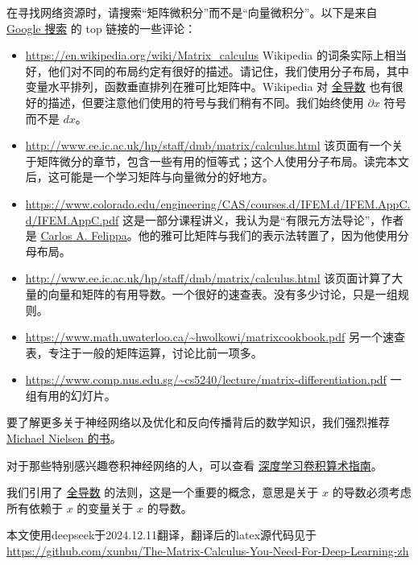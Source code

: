 \documentclass[11pt]{article}
\begin{document}
在寻找网络资源时，请搜索“矩阵微积分”而不是“向量微积分”。以下是来自 \href{https://www.google.com/search?q=matrix+calculus\&oq=matrix+calculus}{Google 搜索} 的 top 链接的一些评论：
\begin{itemize}
\item \href{https://en.wikipedia.org/wiki/Matrix_calculus}{https://en.wikipedia.org/wiki/Matrix_calculus}
Wikipedia 的词条实际上相当好，他们对不同的布局约定有很好的描述。请记住，我们使用分子布局，其中变量水平排列，函数垂直排列在雅可比矩阵中。Wikipedia 对 \href{https://en.wikipedia.org/wiki/Total_derivative}{全导数} 也有很好的描述，但要注意他们使用的符号与我们稍有不同。我们始终使用 $\partial x$ 符号而不是 $dx$。
\item \href{http://www.ee.ic.ac.uk/hp/staff/dmb/matrix/calculus.html}{http://www.ee.ic.ac.uk/hp/staff/dmb/matrix/calculus.html}
该页面有一个关于矩阵微分的章节，包含一些有用的恒等式；这个人使用分子布局。读完本文后，这可能是一个学习矩阵与向量微分的好地方。
\item \href{https://www.colorado.edu/engineering/CAS/courses.d/IFEM.d/IFEM.AppC.d/IFEM.AppC.pdf}{https://www.colorado.edu/engineering/CAS/courses.d/IFEM.d/IFEM.AppC.d/IFEM.AppC.pdf}
这是一部分课程讲义，我认为是“有限元方法导论”，作者是 \href{https://www.colorado.edu/engineering/CAS/courses.d/IFEM.d}{Carlos A. Felippa}。他的雅可比矩阵与我们的表示法转置了，因为他使用分母布局。
\item \href{http://www.ee.ic.ac.uk/hp/staff/dmb/matrix/calculus.html}{http://www.ee.ic.ac.uk/hp/staff/dmb/matrix/calculus.html}
该页面计算了大量的向量和矩阵的有用导数。一个很好的速查表。没有多少讨论，只是一组规则。
\item \href{https://www.math.uwaterloo.ca/~hwolkowi/matrixcookbook.pdf}{https://www.math.uwaterloo.ca/\textasciitilde{}hwolkowi/matrixcookbook.pdf}
另一个速查表，专注于一般的矩阵运算，讨论比前一项多。
\item \href{https://www.comp.nus.edu.sg/~cs5240/lecture/matrix-differentiation.pdf}{https://www.comp.nus.edu.sg/\textasciitilde{}cs5240/lecture/matrix-differentiation.pdf}
一组有用的幻灯片。
\end{itemize}
要了解更多关于神经网络以及优化和反向传播背后的数学知识，我们强烈推荐 \href{http://neuralnetworksanddeeplearning.com/chap1.html}{Michael Nielsen 的书}。

对于那些特别感兴趣卷积神经网络的人，可以查看 \href{https://arxiv.org/pdf/1603.07285.pdf}{深度学习卷积算术指南}。

我们引用了 \href{https://en.wikipedia.org/wiki/Total_derivative}{全导数} 的法则，这是一个重要的概念，意思是关于 $x$ 的导数必须考虑所有依赖于 $x$ 的变量关于 $x$ 的导数。

本文使用deepseek于2024.12.11翻译，翻译后的latex源代码见于\href{https://github.com/xunbu/The-Matrix-Calculus-You-Need-For-Deep-Learning-zh}{https://github.com/xunbu/The-Matrix-Calculus-You-Need-For-Deep-Learning-zh}
\end{document}
